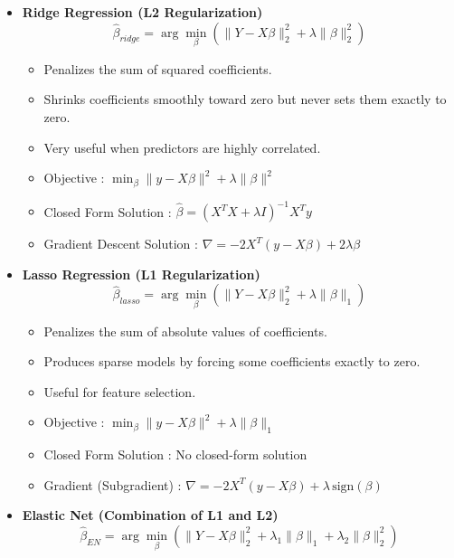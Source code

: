 \documentclass[10pt,a4paper]{article}
\begin{document}
	\begin{itemize}

		\item \textbf{Ridge Regression (L2 Regularization)}
		 			\[
			\hat{\beta}_{ridge}
			= \arg\min_{\beta}
			\left(
			\|Y - X\beta\|_2^2
			+ \lambda \|\beta\|_2^2
			\right)
			\]

		\begin{itemize}
			\item Penalizes the sum of squared coefficients.
			\item Shrinks coefficients smoothly toward zero but never sets them exactly to zero.
			\item Very useful when predictors are highly correlated.
			
			\item Objective : $\min_\beta \|y - X\beta\|^2 + \lambda \|\beta\|^2$
			 \item Closed Form Solution : $\hat{\beta} = (X^T X + \lambda I)^{-1} X^T y $
			 \item Gradient Descent Solution : $\nabla = -2X^T (y - X\beta) + 2\lambda \beta$
			 
		\end{itemize}

		\item \textbf{Lasso Regression (L1 Regularization)}
		 			\[
			\hat{\beta}_{lasso}
			= \arg\min_{\beta}
			\left(
			\|Y - X\beta\|_2^2
			+ \lambda \|\beta\|_1
			\right)
			\]

		\begin{itemize}
			\item Penalizes the sum of absolute values of coefficients.
			\item Produces sparse models by forcing some coefficients exactly to zero.
			\item Useful for feature selection.
			\item Objective : $\min_\beta \|y - X\beta\|^2 + \lambda \|\beta\|_1$
			\item Closed Form Solution : No closed-form solution
			\item Gradient (Subgradient) : $\nabla = -2X^T (y - X\beta) + \lambda \, \text{sign}(\beta)$
		\end{itemize}

		\item \textbf{Elastic Net (Combination of L1 and L2)}
		 \[
			\hat{\beta}_{EN}
			= \arg\min_{\beta}
			\left(
			\|Y - X\beta\|_2^2
			+ \lambda_1 \|\beta\|_1
			+ \lambda_2 \|\beta\|_2^2
			\right)
		\]


\end{itemize}
\end{document}
